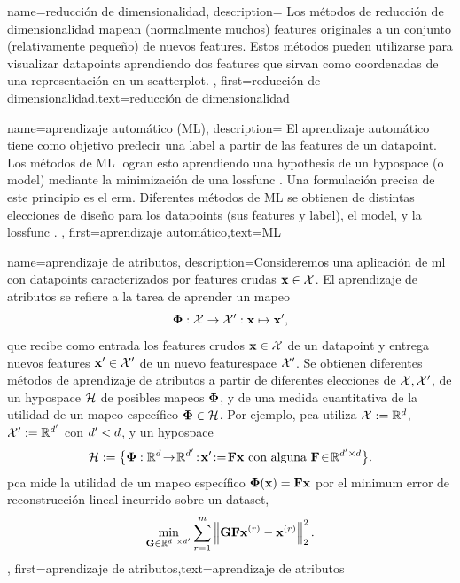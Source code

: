 {name={reducción de dimensionalidad},
	description={
		Los métodos de reducción de dimensionalidad
		mapean (normalmente muchos) \gls{feature}s originales a un conjunto (relativamente pequeño) de
		nuevos \gls{feature}s. Estos métodos pueden utilizarse para visualizar \gls{datapoint}s
		aprendiendo dos \gls{feature}s que sirvan como coordenadas de una representación
		en un \gls{scatterplot}.
	},
	first={reducción de dimensionalidad},text={reducción de dimensionalidad}
}



{name={aprendizaje automático (ML)},
	description={
		El aprendizaje automático tiene como objetivo predecir
		una \gls{label} a partir de las \gls{feature}s de un \gls{datapoint}. Los métodos de ML logran esto
		aprendiendo una \gls{hypothesis} de un \gls{hypospace} (o \gls{model})
		mediante la minimización de una \gls{lossfunc} \cite{MLBasics,HastieWainwrightBook}.
		Una formulación precisa de este principio es el \gls{erm}.
		Diferentes métodos de ML se obtienen de distintas elecciones de diseño para los
		\gls{datapoint}s (sus \gls{feature}s y \gls{label}),
		el \gls{model}, y la \gls{lossfunc} \cite[Cap. 3]{MLBasics}.
	},
	first={aprendizaje automático},text={ML}
}


{name={aprendizaje de atributos},
	description={Consideremos una aplicación de \gls{ml} con \gls{datapoint}s caracterizados por 
	\gls{feature}s crudas ${\bf x} \in \mathcal{X}$. El aprendizaje de atributos
	se refiere a la tarea de aprender un mapeo
		$${\bf \Phi}: \mathcal{X} \rightarrow \mathcal{X}': {\bf x} \mapsto {\bf x}',$$ 
		que recibe como entrada los \gls{feature}s crudos ${\bf x} \in \mathcal{X}$ de un \gls{datapoint} y entrega nuevos
		\gls{feature}s ${\bf x}' \in \mathcal{X}'$ de un nuevo \gls{featurespace} $\mathcal{X}'$. 
		Se obtienen diferentes métodos de aprendizaje de atributos a partir de diferentes elecciones de 
		$\mathcal{X},\mathcal{X}'$, de un \gls{hypospace} $\mathcal{H}$ de posibles mapeos ${\bf \Phi}$, 
		y de una medida cuantitativa de la utilidad de un mapeo específico ${\bf \Phi} \in \mathcal{H}$. Por ejemplo, \gls{pca} utiliza $\mathcal{X} := \mathbb{R}^{d}$, $\mathcal{X}' := \mathbb{R}^{d'}$
		con $d' < d$, y un \gls{hypospace}
		$$\hypospace\defeq \big\{ \featuremapvec: \mathbb{R}^{\dimlocalmodel}
		\!\rightarrow\! \mathbb{R}^{\dimlocalmodel'}\!:\!\featurevec'\!\defeq\!\mF \featurevec \mbox{ con alguna } \mF \!\in\! \mathbb{R}^{\dimlocalmodel' \times \dimlocalmodel} \big\}.$$ \Gls{pca} mide la utilidad de un mapeo específico ${\bf \Phi}({\bf x})= \mathbf{F} {\bf x}$ 
		por el \gls{minimum} error de reconstrucción lineal incurrido sobre un \gls{dataset}, 
$$ \min_{\mG \in \mathbb{R}^{\dimlocalmodel \times \dimlocalmodel'}} \sum_{\sampleidx=1}^{\samplesize} \normgeneric{\mG \mF \featurevec^{(\sampleidx)} - \featurevec^{(\sampleidx)}}{2}^{2}.$$ }, 
	first={aprendizaje de atributos},text={aprendizaje de atributos}
} 

